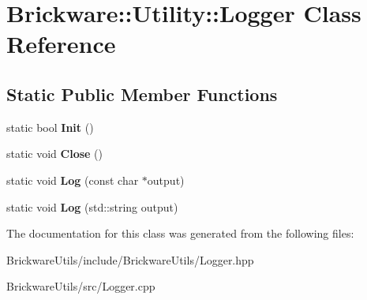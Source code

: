 \hypertarget{classBrickware_1_1Utility_1_1Logger}{}\section{Brickware\+:\+:Utility\+:\+:Logger Class Reference}
\label{classBrickware_1_1Utility_1_1Logger}
\subsection*{Static Public Member Functions}
\begin{DoxyCompactItemize}
\item 
\hypertarget{classBrickware_1_1Utility_1_1Logger_ab1731104f1136aa99f2549c8aa665b18}{}static bool {\bfseries Init} ()\label{classBrickware_1_1Utility_1_1Logger_ab1731104f1136aa99f2549c8aa665b18}

\item 
\hypertarget{classBrickware_1_1Utility_1_1Logger_ab13114d60ca5f1f69f2ba0f2f1a5bd19}{}static void {\bfseries Close} ()\label{classBrickware_1_1Utility_1_1Logger_ab13114d60ca5f1f69f2ba0f2f1a5bd19}

\item 
\hypertarget{classBrickware_1_1Utility_1_1Logger_ac2f8dcf941dc07a9c016c44eb3d002e9}{}static void {\bfseries Log} (const char $\ast$output)\label{classBrickware_1_1Utility_1_1Logger_ac2f8dcf941dc07a9c016c44eb3d002e9}

\item 
\hypertarget{classBrickware_1_1Utility_1_1Logger_ace11d482c50e52940be8a8b43ecbe721}{}static void {\bfseries Log} (std\+::string output)\label{classBrickware_1_1Utility_1_1Logger_ace11d482c50e52940be8a8b43ecbe721}

\end{DoxyCompactItemize}


The documentation for this class was generated from the following files\+:\begin{DoxyCompactItemize}
\item 
Brickware\+Utils/include/\+Brickware\+Utils/Logger.\+hpp\item 
Brickware\+Utils/src/Logger.\+cpp\end{DoxyCompactItemize}
